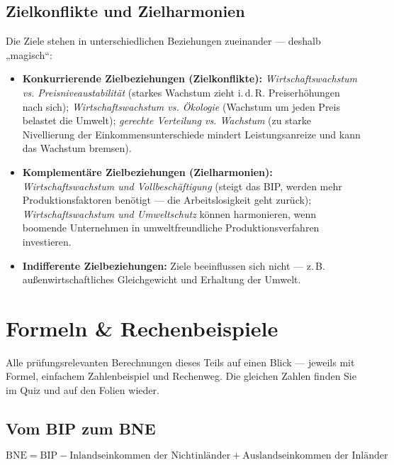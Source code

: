 \documentclass[11pt, a4paper]{article}
\begin{document}
\subsection{Zielkonflikte und Zielharmonien}

Die Ziele stehen in unterschiedlichen Beziehungen zueinander --- deshalb „magisch``:

\begin{itemize}
  \item \textbf{Konkurrierende Zielbeziehungen (Zielkonflikte):}
    \emph{Wirtschaftswachstum vs. Preisniveaustabilität} (starkes Wachstum zieht i.\,d.\,R.
    Preiserhöhungen nach sich); \emph{Wirtschaftswachstum vs. Ökologie} (Wachstum um jeden
    Preis belastet die Umwelt); \emph{gerechte Verteilung vs. Wachstum} (zu starke
    Nivellierung der Einkommensunterschiede mindert Leistungsanreize und kann das
    Wachstum bremsen).
  \item \textbf{Komplementäre Zielbeziehungen (Zielharmonien):}
    \emph{Wirtschaftswachstum und Vollbeschäftigung} (steigt das BIP, werden mehr
    Produktionsfaktoren benötigt --- die Arbeitslosigkeit geht zurück);
    \emph{Wirtschaftswachstum und Umweltschutz} können harmonieren, wenn boomende
    Unternehmen in umweltfreundliche Produktionsverfahren investieren.
  \item \textbf{Indifferente Zielbeziehungen:} Ziele beeinflussen sich nicht ---
    z.\,B. außenwirtschaftliches Gleichgewicht und Erhaltung der Umwelt.
\end{itemize}

\section{Formeln \& Rechenbeispiele}

Alle prüfungsrelevanten Berechnungen dieses Teils auf einen Blick --- jeweils mit
Formel, einfachem Zahlenbeispiel und Rechenweg. Die gleichen Zahlen finden Sie im Quiz
und auf den Folien wieder.

\subsection{Vom BIP zum BNE}

\begin{merksatz}[title={\bfseries Formel: BIP $\rightarrow$ BNE}]
\[
\text{BNE} = \text{BIP} - \text{Inlandseinkommen der Nichtinländer}
+ \text{Auslandseinkommen der Inländer}
\]
\end{merksatz}
\end{document}
